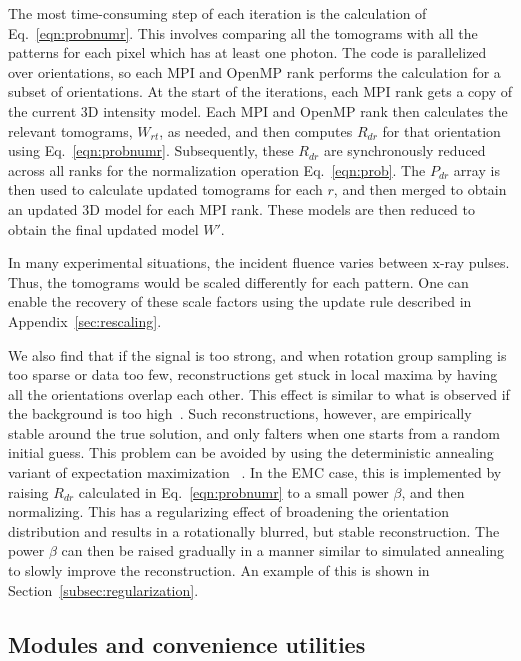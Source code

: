 \documentclass[preprint]{iucr}              %
\begin{document}
The most time-consuming step of each iteration is the calculation of Eq.~\ref{eqn:probnumr}. This involves comparing all the tomograms with all the patterns for each pixel which has at least one photon. The code is parallelized over orientations, so each MPI and OpenMP rank performs the calculation for a subset of orientations. At the start of the iterations, each MPI rank gets a copy of the current 3D intensity model. Each MPI and OpenMP rank then calculates the relevant tomograms, $W_{rt}$, as needed, and then computes $R_{dr}$ for that orientation using Eq.~\ref{eqn:probnumr}. Subsequently, these $R_{dr}$ are synchronously reduced across all ranks for the normalization operation Eq.~\ref{eqn:prob}. The $P_{dr}$ array is then used to calculate updated tomograms for each $r$, and then merged to obtain an updated 3D model for each MPI rank. These models are then reduced to obtain the final updated model $W'$.

In many experimental situations, the incident fluence varies between x-ray pulses. Thus, the tomograms would be scaled differently for each pattern. One can enable the recovery of these scale factors using the update rule described in Appendix~\ref{sec:rescaling}. 

We also find that if the signal is too strong, and when rotation group sampling is too sparse or data too few, reconstructions get stuck in local maxima by having all the orientations overlap each other. This effect is similar to what is observed if the background is too high~\cite{ayyer2015}. Such reconstructions, however, are empirically stable around the true solution, and only falters when one starts from a random initial guess. This problem can be avoided by using the deterministic annealing variant of expectation maximization ~\cite{ueda1998}. In the EMC case, this is implemented by raising $R_{dr}$ calculated in Eq.~\ref{eqn:probnumr} to a small power $\beta$, and then normalizing. This has a regularizing effect of broadening the orientation distribution and results in a rotationally blurred, but stable reconstruction. The power $\beta$ can then be raised gradually in a manner similar to simulated annealing to slowly improve the reconstruction. An example of this is shown in Section~\ref{subsec:regularization}.

\subsection{Modules and convenience utilities}\label{subsec:mod+utils}
\end{document}
